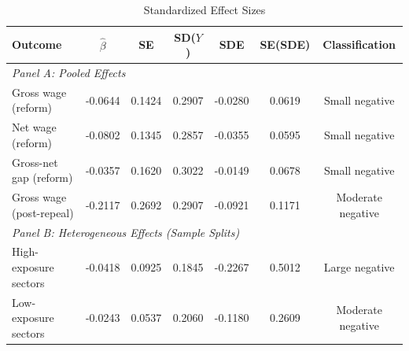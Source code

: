 \begin{table}[htbp]
\centering
\caption{Standardized Effect Sizes}
\label{tab:sde}
\footnotesize
\begin{tabular}{lcccccc}
\hline\hline
Outcome & $\hat{\beta}$ & SE & SD($Y$) & SDE & SE(SDE) & Classification \\
\hline
\multicolumn{7}{l}{\textit{Panel A: Pooled Effects}} \\
Gross wage (reform) & -0.0644 & 0.1424 & 0.2907 & -0.0280 & 0.0619 & Small negative \\
Net wage (reform) & -0.0802 & 0.1345 & 0.2857 & -0.0355 & 0.0595 & Small negative \\
Gross-net gap (reform) & -0.0357 & 0.1620 & 0.3022 & -0.0149 & 0.0678 & Small negative \\
Gross wage (post-repeal) & -0.2117 & 0.2692 & 0.2907 & -0.0921 & 0.1171 & Moderate negative \\
\hline
\multicolumn{7}{l}{\textit{Panel B: Heterogeneous Effects (Sample Splits)}} \\
High-exposure sectors & -0.0418 & 0.0925 & 0.1845 & -0.2267 & 0.5012 & Large negative \\
Low-exposure sectors & -0.0243 & 0.0537 & 0.2060 & -0.1180 & 0.2609 & Moderate negative \\
\hline\hline
\end{tabular}
\par\vspace{0.5em}
\begin{minipage}{\textwidth}
\begin{itemize}[leftmargin=*]

\end{itemize}
\end{minipage}
\end{table}
